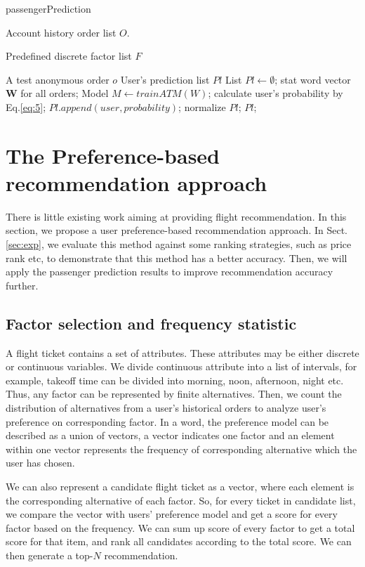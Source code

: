 \documentclass{llncs}
\begin{document}
\begin{algorithm}[htb]
\caption{passengerPrediction}
\begin{algorithmic}[1]
\label{alg:1}
\REQUIRE
Account history order list $O$. \par
Predefined discrete factor list $F$ \par
A test anonymous order $o$
\ENSURE 
User's prediction list $Pl$
\STATE List $Pl \leftarrow \emptyset$;
\STATE stat word vector $\mathbf{W}$ for all orders;
\STATE Model $M \leftarrow trainATM(W)$;
\STATE calculate user's probability by Eq.\ref{eq:5};
\STATE $Pl.append(user,probability)$;
\ENDIF
\ENDFOR
\STATE normalize $Pl$;
\RETURN $Pl$;
\end{algorithmic} 
\end{algorithm}

\section{The Preference-based recommendation approach}
\label{sec:rec}
There is little existing work aiming at providing flight recommendation. In this section, we propose a user preference-based recommendation approach. In Sect.\ref{sec:exp}, we evaluate this method against some ranking strategies, such as price rank etc, to demonstrate that this method has a better accuracy. Then, we will apply the passenger prediction results to improve recommendation accuracy further.

\subsection{Factor selection and frequency statistic}
A flight ticket contains a set of attributes. These attributes may be either discrete or continuous variables. We divide continuous attribute into a list of intervals, for example, takeoff time can be divided into morning, noon, afternoon, night etc. Thus, any factor can be represented by finite alternatives. Then, we count the distribution of alternatives from a user's historical orders to analyze user's preference on corresponding factor. In a word, the preference model can be described as a union of vectors, a vector indicates one factor and an element within one vector represents the frequency of corresponding alternative which the user has chosen.\par
We can also represent a candidate flight ticket as a vector, where each element is the corresponding alternative of each factor. So, for every ticket in candidate list, we compare the vector with users' preference model and get a score for every factor based on the frequency. We can sum up score of every factor to get a total score for that item, and rank all candidates according to the total score. We can then generate a top-$N$ recommendation.\par
\end{document}
